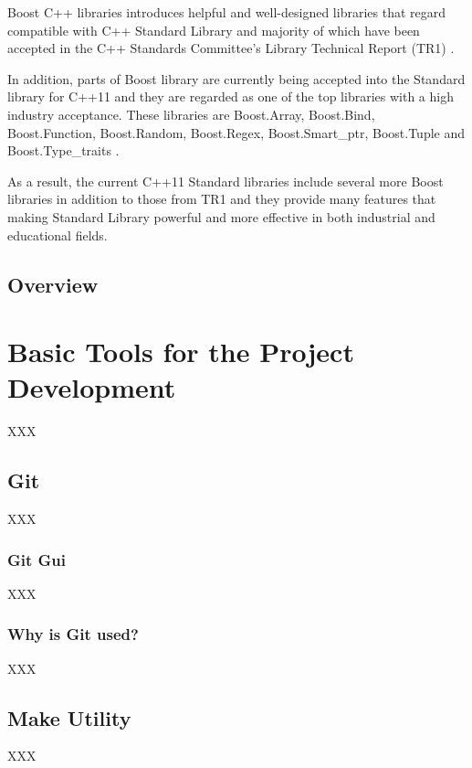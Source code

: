 \documentclass[11pt]{report}
\begin{document}
Boost C++ libraries introduces helpful and well-designed libraries that regard compatible with C++ Standard Library \cite{Deitel:2012:CPP} and majority of which have been accepted in the C++ Standards Committee's Library Technical Report (TR1) \cite{Boost:2007:Cpp}.

In addition, parts of Boost library are currently being accepted into the Standard library for C++11 \cite{Boost:2007:Cpp} and they are regarded as one of the top libraries with a high industry acceptance. These libraries are Boost.Array, Boost.Bind, Boost.Function, Boost.Random, Boost.Regex, Boost.Smart\_ptr, Boost.Tuple and Boost.Type\_traits \cite{Deitel:2012:CPP}.

As a result, the current C++11 Standard libraries include several more Boost libraries in addition to those from TR1 and they provide many features that making Standard Library powerful and more effective in both industrial and educational fields.

\section{Overview}
\label{sec: Overview}
 
\chapter{Basic Tools for the Project Development}
\label{cha: tools}

XXX

\section{Git}
\label{sec: git}
XXX

\subsection{Git Gui}
\label{subsec: gui}
XXX

\subsection{Why is Git used?}
\label{subsec: why git}
XXX

\section{Make Utility}
\label{sec: Make}

XXX
\end{document}
